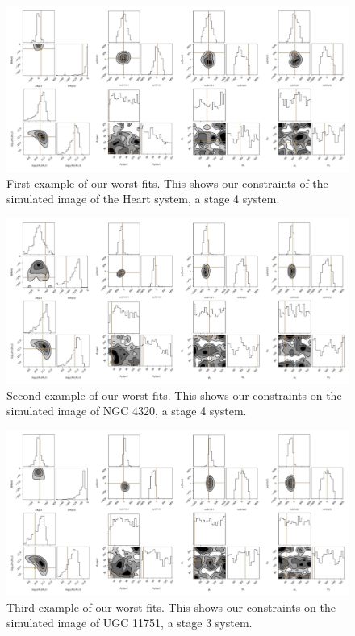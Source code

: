 \begin{figure}
    \centering
    \includegraphics[width=\textwidth]{Chapter1/figures/Heart-red-corner.pdf}
    \caption[First example of our worst fits.]{First example of our worst fits. This shows our constraints of the simulated image of the Heart system, a stage 4 system.}
    \label{fig:worst-Heart}
\end{figure}

\begin{figure}
    \centering
    \includegraphics[width=\textwidth]{Chapter1/figures/Arp57-red-corner.pdf}
    \caption[Second example of our worst fits.]{Second example of our worst fits. This shows our constraints on the simulated image of NGC 4320, a stage 4 system.}
    \label{fig:worst-Arp57}
\end{figure}

\begin{figure}
    \centering
    \includegraphics[width=\textwidth]{Chapter1/figures/UGC11751-red-corner.pdf}
    \caption[Third example of our worst fits.]{Third example of our worst fits. This shows our constraints on the simulated image of UGC 11751, a stage 3 system.}
    \label{fig:worst-UGC11751}
\end{figure}

